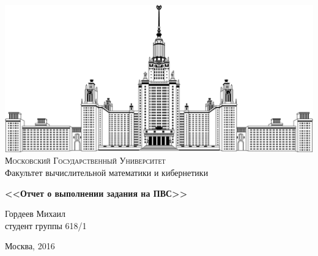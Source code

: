 \documentclass [12pt, a4paper] {article}
\begin{document}
\thispagestyle {empty}

\begin {center}
    \ \vspace{-4cm}

    \includegraphics [width = 0.5 \textwidth] {msu.png} \\
    {\scshape Московский Государственный Университет} \\
    Факультет вычислительной математики и кибернетики\\

    \vspace {5cm}



    {\Huge \bfseries
    <<Отчет о выполнении задания на ПВС>> \\}
\end {center}

\vfill
\vfill

\begin {flushright}
    \large
    Гордеев Михаил \\
    студент группы 618/1 \\

    \vspace {5mm}
\end {flushright}

\vfill

\begin {center}
    Москва, 2016
\end {center}

\enlargethispage {4 \baselineskip}

\newpage
\end{document}
